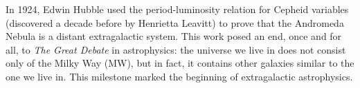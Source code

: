 In 1924, Edwin Hubble used the period-luminosity relation for Cepheid variables (discovered a decade before by Henrietta Leavitt) to prove that the Andromeda Nebula is a distant extragalactic system. This work posed an end, once and for all, to \textit{The Great Debate} in astrophysics: the universe we live in does not consist only of the Milky Way (MW), but in fact, it contains other galaxies similar to the one we live in. This milestone marked the beginning of extragalactic astrophysics.

